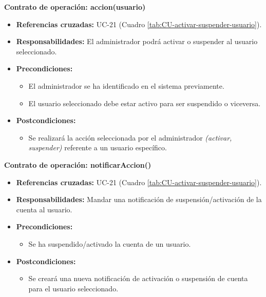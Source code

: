 \textbf{Contrato de operación: accion(usuario)}
\begin{itemize}
\item \textbf{Referencias cruzadas:} UC-21 (Cuadro \ref{tab:CU-activar-suspender-usuario}).
\item \textbf{Responsabilidades:} El administrador podrá activar o suspender al usuario seleccionado.
\item \textbf{Precondiciones:} 
 \begin{itemize}
\item El administrador se ha identificado en el sistema previamente.
\item El usuario seleccionado debe estar activo para ser suspendido o viceversa.
\end {itemize}
\item \textbf{Postcondiciones:} 
 \begin{itemize}
\item Se realizará la acción seleccionada por el administrador \textit{(activar, suspender)} referente a un usuario específico.
\end {itemize}
\end {itemize}

\textbf{Contrato de operación: notificarAccion()}
\begin{itemize}
\item \textbf{Referencias cruzadas:} UC-21 (Cuadro \ref{tab:CU-activar-suspender-usuario}).
\item \textbf{Responsabilidades:} Mandar una notificación de suspensión/activación de la cuenta al usuario.
\item \textbf{Precondiciones:} 
 \begin{itemize}
\item Se ha suspendido/activado la cuenta de un usuario.
\end {itemize}
\item \textbf{Postcondiciones:} 
 \begin{itemize}
\item Se creará una nueva notificación de activación o suspensión de cuenta para el usuario seleccionado.
\end {itemize}
\end {itemize}

